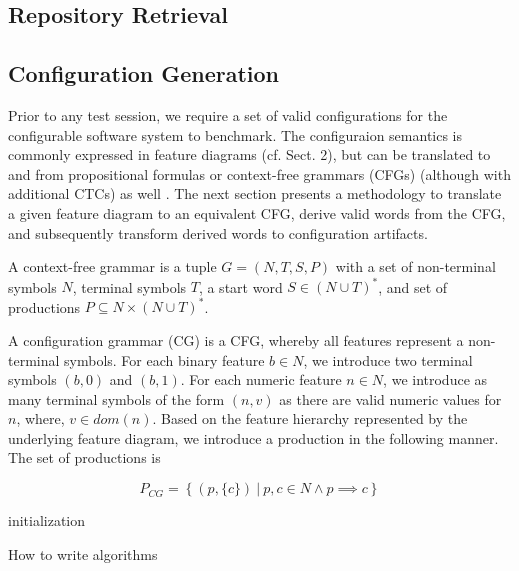 \documentclass[
	12pt,
	a4paper,
	oneside,
	openright
]{book}
\begin{document}
\subsection{Repository Retrieval}
\subsection{Configuration Generation}
Prior to any test session, we require a set of valid configurations for the
configurable software system to benchmark. The configuraion semantics is
commonly expressed in feature diagrams (cf. Sect. 2), but can be translated to
and from propositional formulas or context-free grammars (CFGs) (although with
additional CTCs) as well \citep{batory_feature_2005}. The next section presents
a methodology to translate a given feature diagram to an equivalent CFG, derive
valid words from the CFG, and subsequently transform derived words to
configuration artifacts.

\begin{definition}
A context-free grammar is a tuple $G = (N, T, S, P)$ with a set of non-terminal
symbols $N$, terminal symbols $T$, a start word $S \in (N \cup T)^*$, and set of
productions $P \subseteq N \times (N \cup T)^*$. 
\end{definition}

\begin{definition}
A configuration grammar (CG) is a CFG, whereby all
features represent a non-terminal symbols. For each binary feature $b \in N$, we
introduce two terminal symbols $(b, 0)$ and $(b, 1)$. For each numeric feature
$n \in N$, we introduce as many terminal symbols of the form $(n, v)$ as
there are valid numeric values for $n$, where, $v \in dom(n)$. Based on the
feature hierarchy represented by the underlying feature diagram, we introduce a
production in the following manner. The set of productions is 

$$P_{CG} = \left\{ (p, \lbrace c \rbrace)~|~ p, c \in N \wedge p \implies  c
\right\} $$

\end{definition}

\begin{algorithm}[H]
 initialization\;
 \caption{How to write algorithms}
\end{algorithm}
\end{document}
